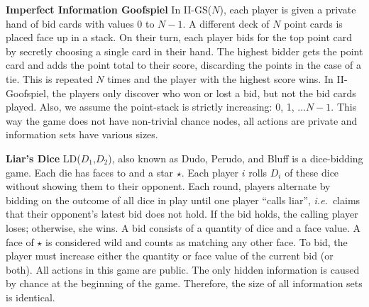 \documentclass{aamas2015}
\newcommand{\ie}{{\it i.e.}~}
\begin{document}
\textbf{Imperfect Information Goofspiel} In II-GS($N$), each player is
given a private hand of bid cards with values $0$ to $N-1$. A different
deck of $N$ point cards is placed face up in a stack.
On their turn, each player bids for the top point card by secretly choosing a single card in their hand. 
The highest bidder gets the point card and adds the point total to their score, discarding
the points in the case of a tie. 
This is repeated $N$ times and the player with the highest score wins.
In II-Goofspiel, the players only discover who won or lost a bid, but not the bid cards played.
Also, we assume the point-stack is strictly increasing: 0, 1, $\ldots N-1$.
This way the game does not have non-trivial chance nodes, all actions are private and information sets have various sizes.

\textbf{Liar's Dice} LD($D_1$,$D_2$), also known as Dudo, Perudo, and Bluff is a dice-bidding game. 
Each die has faces  to  and a star $\star$. 
Each player $i$ rolls $D_i$ of these dice without showing them to their opponent.
Each round, players alternate by bidding on the outcome of all dice in play until one player ``calls liar'', 
\ie claims that their opponent's latest bid does not hold.
If the bid holds, the calling player loses; otherwise, she wins.
A bid consists of a quantity of dice and a face value. 
A face of $\star$ is considered wild and counts as matching any other face.
To bid, the player must increase either the quantity or face value of the current 
bid (or both).
All actions in this game are public. The only hidden information is caused by chance at the beginning of the game. Therefore, the size of all information sets is identical. 
\end{document}
